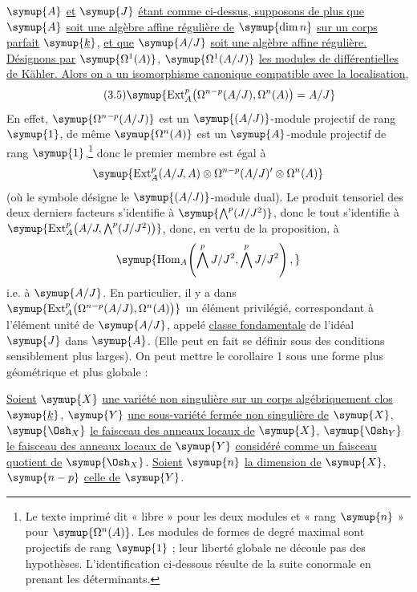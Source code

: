  $\symup{A}$ \uline{et} $\symup{J}$ \uline{étant comme ci-dessus, supposons de plus que}
$\symup{A}$ \uline{soit une algèbre affine régulière de} $\symup{\dim n}$ \uline{sur un corps parfait} $\symup{\underline{k}}$, \uline{et
que} $\symup{A/J}$ \uline{soit une algèbre affine régulière. Désignons par} $\symup{\Omega^{1}(A)}$,
$\symup{\Omega^{1}(A/J)}$ \uline{les modules de différentielles de Kähler. Alors on a un
isomorphisme canonique compatible avec la localisation},
\begin{equation}\tag{3.5}
  \symup{\operatorname{Ext}_{A}^{p}\bigl(\Omega^{n-p}(A/J),\Omega^{n}(A)\bigr)=A/J}
\end{equation}
En effet, $\symup{\Omega^{n-p}(A/J)}$ est un $\symup{(A/J)}$-module projectif de rang $\symup{1}$, de même
$\symup{\Omega^{n}(A)}$ est un $\symup{A}$-module projectif de rang $\symup{1}$,\footnote{Le texte imprimé dit « libre » pour les deux modules et « rang $\symup{n}$ » pour $\symup{\Omega^{n}(A)}$. Les modules de formes de degré maximal sont projectifs de rang $\symup{1}$ ; leur liberté globale ne découle pas des hypothèses. L'identification ci-dessous résulte de la suite conormale en prenant les déterminants.}
donc le premier membre est égal à
\[
  \symup{\operatorname{Ext}_{A}^{p}(A/J,A)
  \otimes\Omega^{n-p}(A/J)'\otimes\Omega^{n}(A)}
\]
(où le symbole \fquote{$\symup{\prime}$} désigne le $\symup{(A/J)}$-module dual). Le produit tensoriel des
deux derniers facteurs s'identifie à $\symup{\bigwedge^{p}(J/J^{2})}$, donc le tout
s'identifie à
$\symup{\operatorname{Ext}_{A}^{p}\!\left(A/J,\bigwedge^{p}(J/J^{2})\right)}$,
donc, en vertu de la proposition, à
\[
  \symup{\operatorname{Hom}_{A}\!\left(\bigwedge^{p}J/J^{2},
  \bigwedge^{p}J/J^{2}\right),}
\]
i.e. à $\symup{A/J}$. En particulier, il y a dans
$\symup{\operatorname{Ext}_{A}^{p}\bigl(\Omega^{n-p}(A/J),\Omega^{n}(A)\bigr)}$ un
élément privilégié, correspondant à l'élément unité de $\symup{A/J}$, appelé
\uline{classe fondamentale} de l'idéal $\symup{J}$ dans $\symup{A}$. (Elle peut en fait se
définir sous des conditions sensiblement plus larges). On peut mettre le
corollaire 1 sous une forme plus géométrique et plus globale :

 \uline{Soient} $\symup{X}$ \uline{une variété non singulière sur un corps
algébriquement clos} $\symup{\underline{k}}$, $\symup{Y}$ \uline{une sous-variété fermée non singulière de} $\symup{X}$,
$\symup{\Osh_X}$ \uline{le faisceau des anneaux locaux de} $\symup{X}$, $\symup{\Osh_Y}$ \uline{le faisceau des anneaux
locaux de} $\symup{Y}$ \uline{considéré comme un faisceau quotient de} $\symup{\Osh_X}$. \uline{Soient} $\symup{n}$ \uline{la
dimension de} $\symup{X}$, $\symup{n-p}$ \uline{celle de} $\symup{Y}$.

